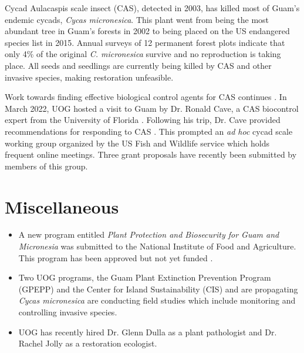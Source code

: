\documentclass[twocolumn]{scrartcl}
\begin{document}
Cycad Aulacaspis scale insect (CAS), detected in 2003, has killed most of Guam’s endemic cycads, \textit{Cycas micronesica}. This plant went from being the
most abundant tree in Guam’s forests in 2002 to being placed on the US endangered species list in 2015. Annual surveys of 12 permanent forest
plots indicate that only 4\% of the original \textit{C. micronesica} survive and no reproduction is taking place. All seeds and seedlings are currently being killed by CAS and other invasive species, making restoration unfeasible. 

Work towards finding effective biological control agents for CAS continues \cite{caveBiologicalControlCycad2022}. In March 2022, UOG hosted a visit to Guam by Dr. Ronald Cave, a CAS biocontrol expert from the University of Florida \cite{caveBiologicalControlCycad2022a}. Following his trip, Dr. Cave provided recommendations for responding to CAS \cite{caveReportUSFish2022}. This prompted an \textit{ad hoc} cycad scale working group organized by the US Fish and Wildlife service which holds frequent online meetings. Three grant proposals have recently been submitted by members of this group.

\section{Miscellaneous}

\begin{itemize}
	\item A new program entitled \textit{Plant Protection and Biosecurity for Guam and Micronesia} was submitted to the National Institute of Food and Agriculture. This program has been approved but not yet funded \cite{NIFA2022}.

	\item Two UOG programs, the Guam Plant Extinction Prevention Program (GPEPP) and the Center for Island Sustainability (CIS) and are propagating \textit{Cycas micronesica} are conducting field studies which include monitoring and controlling invasive species. 
	
	\item UOG has recently hired Dr. Glenn Dulla as a plant pathologist and Dr. Rachel Jolly as a restoration ecologist.
\end{itemize}


\clearpage
\printbibliography
\end{document}

